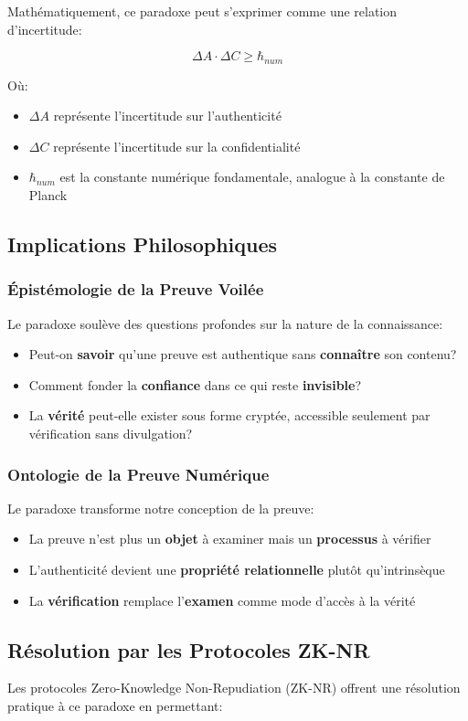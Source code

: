 Mathématiquement, ce paradoxe peut s'exprimer comme une relation d'incertitude:

\[
\Delta A \cdot \Delta C \geq \hbar_{num}
\]

Où:
\begin{itemize}
\item $\Delta A$ représente l'incertitude sur l'authenticité
\item $\Delta C$ représente l'incertitude sur la confidentialité
\item $\hbar_{num}$ est la constante numérique fondamentale, analogue à la constante de Planck
\end{itemize}

\subsection{Implications Philosophiques}
\subsubsection{Épistémologie de la Preuve Voilée}
Le paradoxe soulève des questions profondes sur la nature de la connaissance:
\begin{itemize}
\item Peut-on \textbf{savoir} qu'une preuve est authentique sans \textbf{connaître} son contenu?
\item Comment fonder la \textbf{confiance} dans ce qui reste \textbf{invisible}?
\item La \textbf{vérité} peut-elle exister sous forme cryptée, accessible seulement par vérification sans divulgation?
\end{itemize}

\subsubsection{Ontologie de la Preuve Numérique}
Le paradoxe transforme notre conception de la preuve:
\begin{itemize}
\item La preuve n'est plus un \textbf{objet} à examiner mais un \textbf{processus} à vérifier
\item L'authenticité devient une \textbf{propriété relationnelle} plutôt qu'intrinsèque
\item La \textbf{vérification} remplace l'\textbf{examen} comme mode d'accès à la vérité
\end{itemize}

\subsection{Résolution par les Protocoles ZK-NR}
Les protocoles Zero-Knowledge Non-Repudiation (ZK-NR) offrent une résolution pratique à ce paradoxe en permettant:

